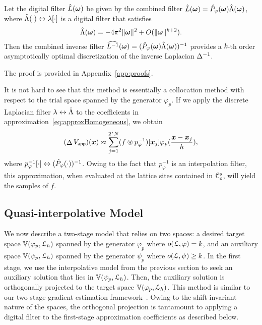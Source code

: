 \begin{prop}
\label{prop:1}
  Let the digital filter $\ft{L}(\vect{\omega})$ be given by the
  combined filter $\ft{L}(\vect{\omega}) =
  \ft{P}_{\varphi}(\vect{\omega})\ft{\Lambda}(\vect{\omega})$, where
  $\ftpairs{\ft{\Lambda}(\cdot)}{\lambda[\cdot]}$ is a digital filter that satisfies
  \begin{equation}
    \ft{\Lambda}(\vect{\omega}) = -4\pi^2\norm{\vect{\omega}}^2 
    + O(\norm{\vect{\omega}}^{k+2}).
    \label{eq:discreteLaplacian}
  \end{equation}
  Then the combined inverse filter $\wft{L^{-1}}(\vect{\omega}) =
  (\ft{P}_{\varphi}(\vect{\omega})\ft{\Lambda}(\vect{\omega}))^{-1}$
  provides a $k$-th order asymptotically optimal discretization of the
  inverse Laplacian $\invlaplacian$.
\end{prop}
The proof is provided in Appendix~\ref{app:proofs}.

It is not hard to see that this method is essentially a collocation method with
respect to the trial space spanned by the generator $\varphi_p$. If we apply the
discrete Laplacian filter $\ftpairs{\lambda}{\ft{\Lambda}}$ to the
coefficients in approximation~\eqref{eq:approxHomogeneous}, we obtain
\begin{equation}
  (\laplacian \appf{V})(\vect{x}) \approx
  \sum_{j=1}^{2^s N}
  (f \pconv p_{\varphi}^{-1})[\vect{x}_j]
  \varphi_p(\frac{\vect{x}-\vect{x}_j}{h}),
\end{equation}
where
$\ftpairs{p_{\varphi}^{-1}[\cdot]}{(\ft{P}_{\varphi}(\cdot))^{-1}}$. Owing to 
the fact that $p^{-1}_{\varphi}$ is an interpolation filter, this approximation,
when evaluated at the lattice sites contained in $\oucube^s$, will yield the
samples of $f$.

\subsection{Quasi-interpolative Model}

We now describe a two-stage model that relies on two spaces: a desired
target space $\aspace{\lattice{L}_h}{\varphi_p}$ spanned by the
generator $\varphi_p$ where $\order{\lattice{L}}{\varphi} = k$, and an
auxiliary space $\aspace{\lattice{L}_h}{\psi_p}$ spanned by the
generator $\psi_p$ where $\order{\lattice{L}}{\psi} \ge k$. In the
first stage, we use the interpolative model from the previous section
to seek an auxiliary solution that lies in
$\aspace{\lattice{L}_h}{\psi_p}$. Then, the auxiliary solution is
orthogonally projected to the target space
$\aspace{\lattice{L}_h}{\varphi_p}$. This method is similar to our
two-stage gradient estimation framework~\cite{hossain10}. Owing to the
shift-invariant nature of the spaces, the orthogonal projection is
tantamount to applying a digital filter to the first-stage
approximation coefficients as described below.

